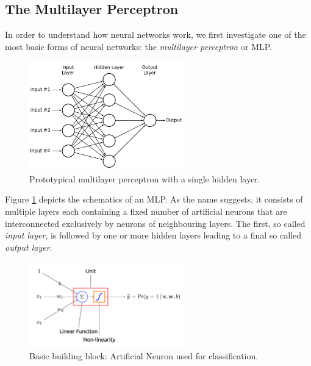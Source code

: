 \subsection{The Multilayer Perceptron}
In order to understand how neural networks work, we first investigate one of the most basic forms of neural networks: the \emph{multilayer perceptron} or MLP. 
\begin{figure}[H]

\caption{Prototypical multilayer perceptron with a single hidden layer.}\label{fig:multilayer-perceptron}
\centering
\includegraphics[width=0.6\textwidth]{figures/chapter-2/multilayer-perceptron.png}
\end{figure}
Figure \ref{fig:multilayer-perceptron} depicts the schematics of an MLP. As the name suggests, it consists of multiple layers each containing a fixed number of artificial neurons that are interconnected exclusively by neurons of neighbouring layers. The first, so called \emph{input layer}, is followed by one or more hidden layers leading to a final so called \emph{output layer}. 

\begin{figure}[h]
	\caption{Basic building block: Artificial Neuron used for classification.}\label{fig:artificial-neuron}   
	\centering
	\includegraphics[width=0.6\textwidth]{figures/chapter-2/artificial-neuron.png}
\end{figure}


